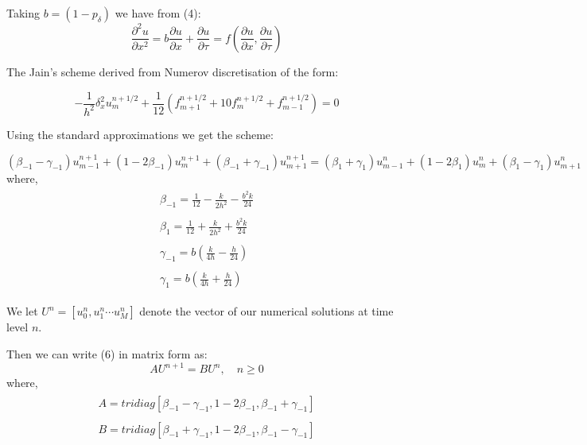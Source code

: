 \documentclass[11pt]{article}
\begin{document}
Taking $b=(1-p_{\delta})$ we have from (4):
\begin{equation*}
    \frac{\partial^{2}u}{\partial x^{2}} = b\frac{\partial u}{\partial x} + \frac{\partial u}{\partial \tau} = f(\frac{\partial u}{\partial x}, \frac{\partial u}{\partial \tau})    
\end{equation*}

The Jain's scheme derived from Numerov discretisation of the form:

\begin{equation}
-\frac{1}{h^{2}}\delta_{x}^{2}u_{m}^{n+1/2}+\frac{1}{12}(f_{m+1}^{n+1/2}+10f_{m}^{n+1/2}+f_{m-1}^{n+1/2})=0
\end{equation}

Using the standard approximations we get the scheme:

\begin{equation}
    (\beta_{-1}-\gamma_{-1})u_{m-1}^{n+1}+(1-2\beta_{-1})u_{m}^{n+1}+(\beta_{-1}+\gamma_{-1})u_{m+1}^{n+1} = (\beta_{1}+\gamma_{1})u_{m-1}^{n}+(1-2\beta_{1})u_{m}^{n}+(\beta_{1}-\gamma_{1})u_{m+1}^{n}
\end{equation}
where,
\begin{align*}
    \begin{split}
        \beta_{-1} = \frac{1}{12}-\frac{k}{2h^{2}}-\frac{b^{2}k}{24}
    \end{split}\\
    \begin{split}
        \beta_{1} = \frac{1}{12}+\frac{k}{2h^{2}}+\frac{b^{2}k}{24}
    \end{split}\\
    \begin{split}
        \gamma_{-1} = b(\frac{k}{4h}-\frac{h}{24})
    \end{split}\\
    \begin{split}
        \gamma_{1} = b(\frac{k}{4h}+\frac{h}{24})
    \end{split}
\end{align*}

We let $U^{n} = [u_{0}^{n}, u_{1}^{n} \cdots u_{M}^{n}]$ denote the vector of our numerical solutions at time level $n$.

Then we can write (6) in matrix form as:
\begin{equation*}
    AU^{n+1} = BU^{n}, \quad n \ge 0
\end{equation*}
where, 
\begin{align*}
    \begin{split}
        A = tridiag[\beta_{-1}-\gamma_{-1}, 1-2\beta_{-1}, \beta_{-1}+\gamma_{-1}]
    \end{split}\\
    \begin{split}
        B = tridiag[\beta_{-1}+\gamma_{-1}, 1-2\beta_{-1}, \beta_{-1}-\gamma_{-1}]
    \end{split}\\
\end{align*}
\end{document}
